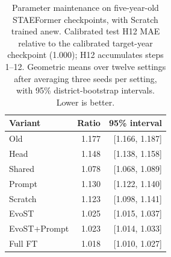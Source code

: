 \begin{table}[t]
\centering
\caption{Parameter maintenance on five-year-old STAEFormer checkpoints, with Scratch trained anew. Calibrated test H12 MAE relative to the calibrated target-year checkpoint (1.000); H12 accumulates steps 1--12. Geometric means over twelve settings after averaging three seeds per setting, with 95\% district-bootstrap intervals. Lower is better.}
\label{tab:maintenance}
\begin{tabular}{lrr}
\toprule
Variant & Ratio & 95\% interval \\
\midrule
Old & 1.177 & [1.166, 1.187] \\
Head & 1.148 & [1.138, 1.158] \\
Shared & 1.078 & [1.068, 1.089] \\
Prompt & 1.130 & [1.122, 1.140] \\
Scratch & 1.123 & [1.098, 1.141] \\
EvoST & 1.025 & [1.015, 1.037] \\
EvoST+Prompt & 1.023 & [1.014, 1.033] \\
Full FT & 1.018 & [1.010, 1.027] \\
\bottomrule
\end{tabular}
\end{table}
